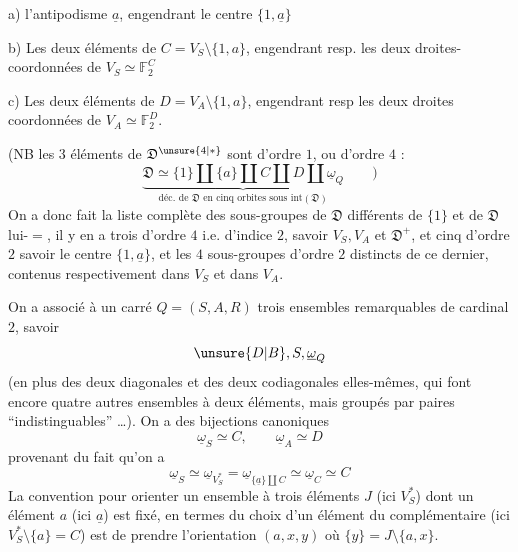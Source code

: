 a) l'antipodisme $\underline a$, engendrant le centre $\{1,\underline a\}$

b) Les deux éléments de $C=V_S\setminus\{1,a\}$, engendrant resp. les deux droites-coordonnées de $V_S\simeq\mathbb{F}_2^C$

c) Les deux éléments de $D=V_A\setminus\{1,a\}$, engendrant resp les deux droites coordonnées de $V_A\simeq\mathbb{F}_2^D$.

(NB les  $3$ éléments de $\mathfrak{D}^{\unsure{4|*}}$ sont d'ordre $1$, ou d'ordre $4$ :
\[
\underbrace{\mathfrak{D}\simeq\{1\}\amalg\{a\}\amalg C\amalg D\amalg\underline\omega_Q}_{\text{déc. de }\mathfrak{D}\text{ en cinq orbites sous }\mathrm{int}(\mathfrak D)}\qquad)
\]
On a donc fait la liste complète des sous-groupes de $\mathfrak{D}$ différents de $\{1\}$ et de $\mathfrak{D}$ lui-$=$, il y en a trois d'ordre $4$ i.e. d'indice $2$, savoir $V_S,V_A$ et $\mathfrak{D}^+$, et cinq d'ordre $2$ savoir le centre $\{1,\underline a\}$, et les $4$  sous-groupes d'ordre $2$ distincts de ce dernier, contenus respectivement dans $V_S$ et dans $V_A$.

On a associé à un carré $Q=(S,A,R)$ trois ensembles remarquables de cardinal $2$, savoir
\[
\unsure{D|B},S,\underline\omega_Q
\]
(en plus des deux diagonales et des deux codiagonales elles-mêmes, qui font encore quatre autres ensembles à deux éléments, mais groupés par paires ``indistinguables'' \ldots). On a des bijections canoniques
\[
\underline\omega_S\simeq C,\qquad\underline\omega_A\simeq D
\]
provenant du fait qu'on a
\[
\underline\omega_S\simeq\underline\omega_{V_S^*}=\underline\omega_{\{\underline a\}\amalg C}\simeq\underline\omega_C\simeq C
\]
La convention pour orienter un ensemble à trois éléments $J$ (ici $V_S^*$) dont un élément $a$ (ici $\underline a$) est fixé, en termes du choix d'un élément  du complémentaire (ici $V_S^*\setminus\{a\}=C$) est de prendre l'orientation $(a,x,y)$  où $\{y\}=J\setminus\{a,x\}$.

